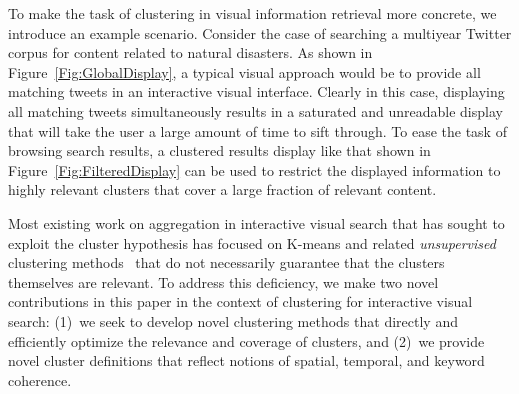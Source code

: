 To make the task of clustering in visual information retrieval more concrete, we introduce an example scenario.
Consider the case of searching a multiyear Twitter corpus for content related to natural disasters.  
As shown in Figure~\ref{Fig:GlobalDisplay}, a typical visual approach would be to provide all matching tweets in an interactive visual interface.
Clearly in this case, displaying all matching tweets simultaneously
results in a saturated and unreadable display that will take the user a large amount of time to sift through. 
To ease the task of browsing search results, a clustered results display like that shown in Figure~\ref{Fig:FilteredDisplay} can be used to restrict the displayed information to highly relevant clusters that cover a large fraction of relevant content. 

Most existing work on aggregation in interactive visual search that has sought to exploit the cluster hypothesis has focused on K-means and related \emph{unsupervised} clustering methods~\cite{Ahlberg1995,Liu2014,Sankaranarayanan2009,Teitler2008,Bennamane2012,Shneiderman2013,Yifan2015,Smith2009} that do not necessarily guarantee that the clusters themselves are relevant.  To address this deficiency, we make two novel contributions in this paper in the context of clustering for interactive visual search: (1)~we seek to develop novel clustering methods that directly and efficiently optimize the relevance and coverage of clusters, and (2)~we provide novel cluster definitions that reflect notions of spatial, temporal, and keyword coherence. 

